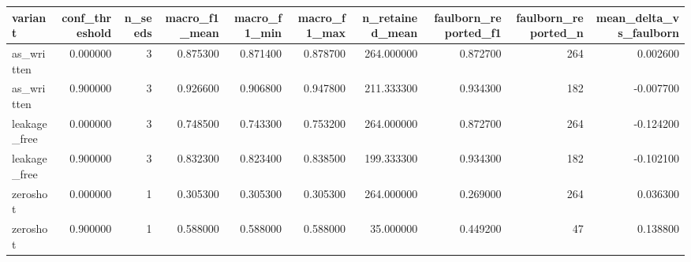\begin{tabular}{lrrrrrrrrr}
\toprule
variant & conf_threshold & n_seeds & macro_f1_mean & macro_f1_min & macro_f1_max & n_retained_mean & faulborn_reported_f1 & faulborn_reported_n & mean_delta_vs_faulborn \\
\midrule
as_written & 0.000000 & 3 & 0.875300 & 0.871400 & 0.878700 & 264.000000 & 0.872700 & 264 & 0.002600 \\
as_written & 0.900000 & 3 & 0.926600 & 0.906800 & 0.947800 & 211.333300 & 0.934300 & 182 & -0.007700 \\
leakage_free & 0.000000 & 3 & 0.748500 & 0.743300 & 0.753200 & 264.000000 & 0.872700 & 264 & -0.124200 \\
leakage_free & 0.900000 & 3 & 0.832300 & 0.823400 & 0.838500 & 199.333300 & 0.934300 & 182 & -0.102100 \\
zeroshot & 0.000000 & 1 & 0.305300 & 0.305300 & 0.305300 & 264.000000 & 0.269000 & 264 & 0.036300 \\
zeroshot & 0.900000 & 1 & 0.588000 & 0.588000 & 0.588000 & 35.000000 & 0.449200 & 47 & 0.138800 \\
\bottomrule
\end{tabular}
